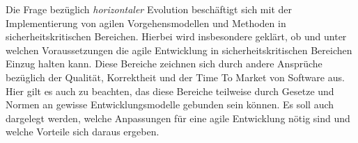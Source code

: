 \documentclass[
	12pt,
	a4paper,
	bibtotocnumbered
	]{scrreprt}
\begin{document}
{Die Frage bezüglich \emph{horizontaler} Evolution beschäftigt sich mit der Implementierung von agilen Vorgehensmodellen und Methoden in sicherheitskritischen Bereichen. 
Hierbei wird insbesondere geklärt, ob und unter welchen Voraussetzungen die agile Entwicklung in sicherheitskritischen Bereichen Einzug halten kann.
Diese Bereiche zeichnen sich durch andere Ansprüche bezüglich der Qualität, Korrektheit und der Time To Market von Software aus.
Hier gilt es auch zu beachten, das diese Bereiche teilweise durch Gesetze und Normen an gewisse Entwicklungsmodelle gebunden sein können.
Es soll auch dargelegt werden, welche Anpassungen für eine agile Entwicklung nötig sind und welche Vorteile sich daraus ergeben.

}

\begin{singlespace}

\setcounter{page}{1}

\end{singlespace}

\tableofcontents
\listoffigures
%

\cleardoublepage













\printbibliography

\end{document}
